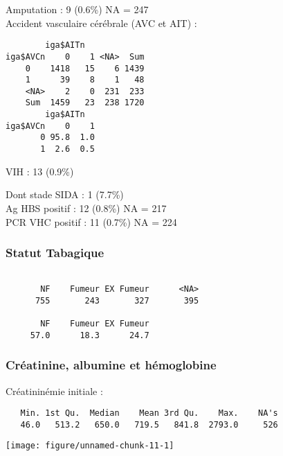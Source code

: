 \documentclass[11pt,a4paper]{article}\usepackage[]{graphicx}\usepackage[]{color}
\makeatletter
\def\maxwidth{ %
  \ifdim\Gin@nat@width>\linewidth
    \linewidth
  \else
    \Gin@nat@width
  \fi
}
\newenvironment{kframe}{%
 \def\at@end@of@kframe{}%
 \ifinner\ifhmode%
  \def\at@end@of@kframe{\end{minipage}}%
  \begin{minipage}{\columnwidth}%
 \fi\fi%
 \def\FrameCommand##1{\hskip\@totalleftmargin \hskip-\fboxsep
 \colorbox{shadecolor}{##1}\hskip-\fboxsep
     \hskip-\linewidth \hskip-\@totalleftmargin \hskip\columnwidth}%
 \MakeFramed {\advance\hsize-\width
   \@totalleftmargin\z@ \linewidth\hsize
   \@setminipage}}%
 {\par\unskip\endMakeFramed%
 \at@end@of@kframe}
\newenvironment{knitrout}{}{} %
\makeatother
\begin{document}
Amputation : 9 (0.6\%) NA = 247
~\\

Accident vasculaire cérébrale (AVC et AIT) :

\begin{knitrout}
\color{fgcolor}\begin{kframe}
\begin{verbatim}
        iga$AITn
iga$AVCn    0    1 <NA>  Sum
    0    1418   15    6 1439
    1      39    8    1   48
    <NA>    2    0  231  233
    Sum  1459   23  238 1720
        iga$AITn
iga$AVCn    0    1
       0 95.8  1.0
       1  2.6  0.5
\end{verbatim}
\end{kframe}
\end{knitrout}

VIH : 13 (0.9\%)

Dont stade SIDA : 1 (7.7\%)
~\\

Ag HBS positif : 12 (0.8\%) NA = 217
~\\

PCR VHC positif : 11 (0.7\%) NA = 224


    \subsubsection{Statut Tabagique}

\begin{knitrout}
\color{fgcolor}\begin{kframe}
\begin{verbatim}

       NF    Fumeur EX Fumeur      <NA> 
      755       243       327       395 

       NF    Fumeur EX Fumeur 
     57.0      18.3      24.7 
\end{verbatim}
\end{kframe}
\end{knitrout}

    \subsubsection{Créatinine, albumine et hémoglobine}

Créatininémie initiale :

\begin{knitrout}
\color{fgcolor}\begin{kframe}
\begin{verbatim}
   Min. 1st Qu.  Median    Mean 3rd Qu.    Max.    NA's 
   46.0   513.2   650.0   719.5   841.8  2793.0     526 
\end{verbatim}
\end{kframe}
\texttt{[image: figure/unnamed-chunk-11-1]} 

\end{knitrout}
\end{document}
